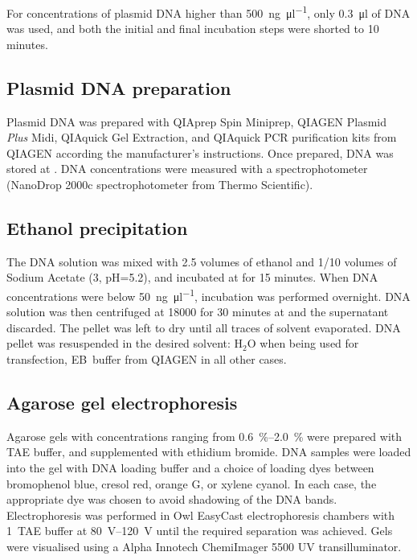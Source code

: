       For concentrations of plasmid DNA higher than \SI{500}{\ng\per\ul}, only
      \SI{0.3}{\ul} of DNA was used, and both the initial and final incubation
      steps were shorted to 10 minutes.

    \subsection{Plasmid DNA preparation}
      Plasmid DNA was prepared with QIAprep Spin Miniprep,
      QIAGEN Plasmid \textit{Plus} Midi, QIAquick Gel Extraction, and QIAquick
      PCR purification kits from QIAGEN
      according the manufacturer's instructions.
      Once prepared, DNA was stored at .
      DNA concentrations were measured
      with a spectrophotometer (NanoDrop 2000c spectrophotometer from
      Thermo Scientific).

    \subsection{Ethanol precipitation}
      \label{sec:ethanol-precipitation}
      The DNA solution was mixed with \num{2.5} volumes of  ethanol
      and \num{1/10} volumes of Sodium Acetate (\SI{3}{\Molar}, pH=\num{5.2}),
      and incubated at  for 15 minutes. When DNA concentrations were below
      \SI{50}{\ng\per\ul}, incubation was performed overnight.
      DNA solution was then centrifuged at
      \SI{18000}{\gn} for 30 minutes at  and the supernatant discarded.
      The pellet was left to dry until all traces of solvent evaporated.
      DNA pellet
      was resuspended in the desired solvent:
      H$_2$O when being used for transfection,
      EB~buffer from QIAGEN in all other cases.

    \subsection{Agarose gel electrophoresis}
      Agarose gels with concentrations ranging from \SIrange{0.6}{2.0}{\percent}
      were prepared with TAE buffer, and supplemented with ethidium bromide.
      DNA samples were loaded into the gel with DNA loading buffer and a
      choice of loading dyes between bromophenol blue, cresol red, orange G, or
      xylene cyanol.  In each case, the appropriate dye was chosen
      to avoid shadowing of the DNA bands. Electrophoresis was
      performed in Owl EasyCast electrophoresis chambers with
      \SI{1}{\X}~TAE buffer at
      \SIrange{80}{120}{\volt} until the required separation was achieved.
      Gels were visualised using a
      Alpha Innotech ChemiImager 5500 UV transilluminator.

